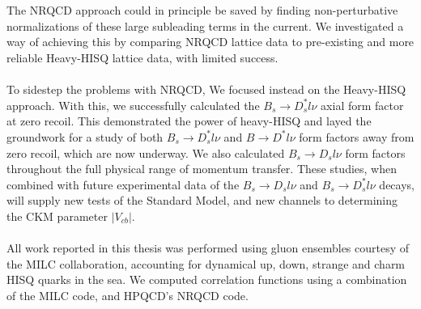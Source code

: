 \\ \\
The NRQCD approach could in principle be saved by finding non-perturbative normalizations of these large subleading terms in the current. We investigated a way of achieving this by comparing NRQCD lattice data to pre-existing and more reliable Heavy-HISQ lattice data, with limited success.
\\ \\
To sidestep the problems with NRQCD, We focused instead on the Heavy-HISQ approach. With this, we successfully calculated the $B_s\to D_s^*l\nu$ axial form factor at zero recoil. This demonstrated the power of heavy-HISQ and layed the groundwork for a study of both $B_s\to D_s^*l\nu$ and $B\to D^*l\nu$ form factors away from zero recoil, which are now underway. We also calculated $B_s\to D_sl\nu$ form factors throughout the full physical range of momentum transfer. These studies, when combined with future experimental data of the $B_s\to D_sl\nu$ and $B_s\to D_s^*l\nu$ decays, will supply new tests of the Standard Model, and new channels to determining the CKM parameter $|V_{cb}|$.
\\ \\
All work reported in this thesis was performed using gluon ensembles courtesy of the MILC collaboration, accounting for dynamical up, down, strange and charm HISQ quarks in the sea. We computed correlation functions using a combination of the MILC code, and HPQCD's NRQCD code.
